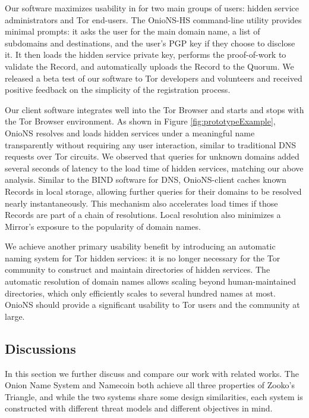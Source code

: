 \documentclass[conference]{IEEEtran}
\begin{document}
Our software maximizes usability in for two main groups of users: hidden service administrators and Tor end-users. The OnioNS-HS command-line utility provides minimal prompts: it asks the user for the main domain name, a list of subdomains and destinations, and the user's PGP key if they choose to disclose it. It then loads the hidden service private key, performs the proof-of-work to validate the Record, and automatically uploads the Record to the Quorum. We released a beta test of our software to Tor developers and volunteers and received positive feedback on the simplicity of the registration process.

Our client software integrates well into the Tor Browser and starts and stops with the Tor Browser environment. As shown in Figure \ref{fig:prototypeExample}, OnioNS resolves and loads hidden services under a meaningful name transparently without requiring any user interaction, similar to traditional DNS requests over Tor circuits. We observed that queries for unknown domains added several seconds of latency to the load time of hidden services, matching our above analysis. Similar to the BIND software for DNS, OnioNS-client caches known Records in local storage, allowing further queries for their domains to be resolved nearly instantaneously. This mechanism also accelerates load times if those Records are part of a chain of resolutions. Local resolution also minimizes a Mirror's exposure to the popularity of domain names.


We achieve another primary usability benefit by introducing an automatic naming system for Tor hidden services: it is no longer necessary for the Tor community to construct and maintain directories of hidden services. The automatic resolution of domain names allows scaling beyond human-maintained directories, which only efficiently scales to several hundred names at most. OnioNS should provide a significant usability to Tor users and the community at large.

\subsection{Discussions}

In this section we further discuss and compare our work with related works. The Onion Name System and Namecoin both achieve all three properties of Zooko's Triangle, and while the two systems share some design similarities, each system is constructed with different threat models and different objectives in mind.
\end{document}
